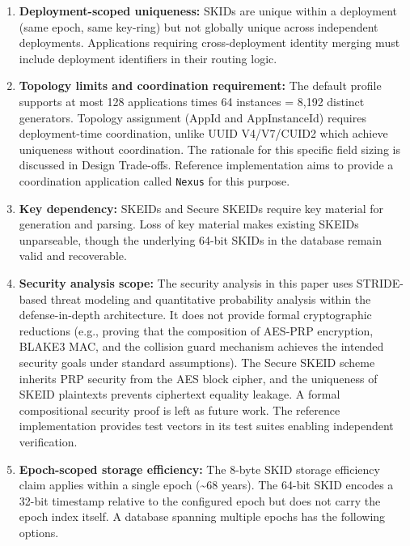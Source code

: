\documentclass[fleqn,10pt]{wlpeerj}
\begin{document}
\begin{enumerate}
\def\labelenumi{\arabic{enumi}.}
\item
  \textbf{Deployment-scoped uniqueness:} SKIDs are unique within a
  deployment (same epoch, same key-ring) but not globally unique across
  independent deployments. Applications requiring cross-deployment
  identity merging must include deployment identifiers in their routing
  logic.
\item
  \textbf{Topology limits and coordination requirement:} The default
  profile supports at most 128 applications times 64 instances = 8,192
  distinct generators. Topology assignment (AppId and AppInstanceId)
  requires deployment-time coordination, unlike UUID V4/V7/CUID2 which
  achieve uniqueness without coordination. The rationale for this
  specific field sizing is discussed in Design Trade-offs. Reference
  implementation aims to provide a coordination application called
  \texttt{Nexus} for this purpose.
\item
  \textbf{Key dependency:} SKEIDs and Secure SKEIDs require key material
  for generation and parsing. Loss of key material makes existing SKEIDs
  unparseable, though the underlying 64-bit SKIDs in the database remain
  valid and recoverable.
\item
  \textbf{Security analysis scope:} The security analysis in this paper
  uses STRIDE-based threat modeling and quantitative probability
  analysis within the defense-in-depth architecture. It does not provide
  formal cryptographic reductions (e.g., proving that the composition of
  AES-PRP encryption, BLAKE3 MAC, and the collision guard mechanism
  achieves the intended security goals under standard assumptions). The
  Secure SKEID scheme inherits PRP security from the AES block cipher,
  and the uniqueness of SKEID plaintexts prevents ciphertext equality
  leakage. A formal compositional security proof is left as future work.
  The reference implementation provides test vectors in its test suites
  enabling independent verification.
\item
  \textbf{Epoch-scoped storage efficiency:} The 8-byte SKID storage
  efficiency claim applies within a single epoch (\textasciitilde68
  years). The 64-bit SKID encodes a 32-bit timestamp relative to the
  configured epoch but does not carry the epoch index itself. A database
  spanning multiple epochs has the following options.


\end{enumerate}
\end{document}
